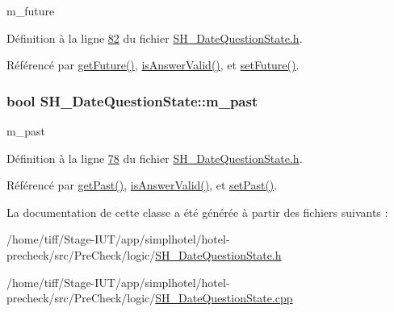 m\-\_\-future 



Définition à la ligne \hyperlink{SH__DateQuestionState_8h_source_l00082}{82} du fichier \hyperlink{SH__DateQuestionState_8h_source}{S\-H\-\_\-\-Date\-Question\-State.\-h}.



Référencé par \hyperlink{classSH__DateQuestionState_aa0ac7bfdd8528fdbc7b517d7f2f1fcc7}{get\-Future()}, \hyperlink{classSH__DateQuestionState_aacd24891431755fb857c17a864d39ba9}{is\-Answer\-Valid()}, et \hyperlink{classSH__DateQuestionState_ae160da14278cb25ce255f108f481d5eb}{set\-Future()}.

\hypertarget{classSH__DateQuestionState_afa33fd208cf539167bcc26c83e57d803}{
\subsubsection[{m\-\_\-past}]{\setlength{\rightskip}{0pt plus 5cm}bool S\-H\-\_\-\-Date\-Question\-State\-::m\-\_\-past\hspace{0.3cm}{\ttfamily [private]}}}\label{classSH__DateQuestionState_afa33fd208cf539167bcc26c83e57d803}


m\-\_\-past 



Définition à la ligne \hyperlink{SH__DateQuestionState_8h_source_l00078}{78} du fichier \hyperlink{SH__DateQuestionState_8h_source}{S\-H\-\_\-\-Date\-Question\-State.\-h}.



Référencé par \hyperlink{classSH__DateQuestionState_a13b9815a4c8b0f5bd78426efdc754b8c}{get\-Past()}, \hyperlink{classSH__DateQuestionState_aacd24891431755fb857c17a864d39ba9}{is\-Answer\-Valid()}, et \hyperlink{classSH__DateQuestionState_a06f77c3d6449354c0d1135cc9755dd41}{set\-Past()}.



La documentation de cette classe a été générée à partir des fichiers suivants \-:\begin{DoxyCompactItemize}
\item 
/home/tiff/\-Stage-\/\-I\-U\-T/app/simplhotel/hotel-\/precheck/src/\-Pre\-Check/logic/\hyperlink{SH__DateQuestionState_8h}{S\-H\-\_\-\-Date\-Question\-State.\-h}\item 
/home/tiff/\-Stage-\/\-I\-U\-T/app/simplhotel/hotel-\/precheck/src/\-Pre\-Check/logic/\hyperlink{SH__DateQuestionState_8cpp}{S\-H\-\_\-\-Date\-Question\-State.\-cpp}\end{DoxyCompactItemize}
